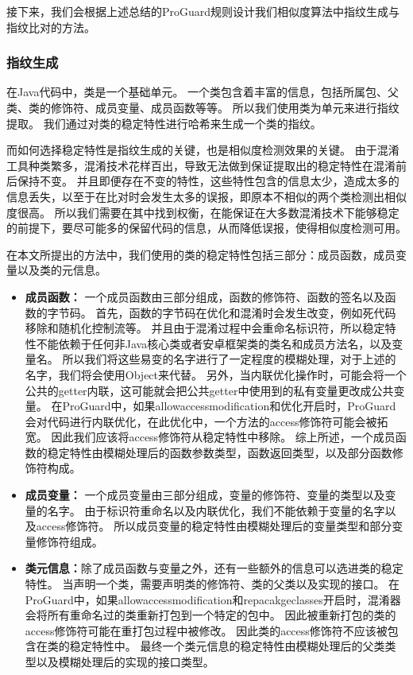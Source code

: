 接下来，我们会根据上述总结的ProGuard规则设计我们相似度算法中指纹生成与指纹比对的方法。

\subsubsection{指纹生成}

在Java代码中，类是一个基础单元。
一个类包含着丰富的信息，包括所属包、父类、类的修饰符、成员变量、成员函数等等。
所以我们使用类为单元来进行指纹提取。
我们通过对类的稳定特性进行哈希来生成一个类的指纹。

而如何选择稳定特性是指纹生成的关键，也是相似度检测效果的关键。
由于混淆工具种类繁多，混淆技术花样百出，导致无法做到保证提取出的稳定特性在混淆前后保持不变。
并且即便存在不变的特性，这些特性包含的信息太少，造成太多的信息丢失，以至于在比对时会发生太多的误报，即原本不相似的两个类检测出相似度很高。
所以我们需要在其中找到权衡，在能保证在大多数混淆技术下能够稳定的前提下，要尽可能多的保留代码的信息，从而降低误报，使得相似度检测可用。

在本文所提出的方法中，我们使用的类的稳定特性包括三部分：成员函数，成员变量以及类的元信息。

\begin{itemize}
	\item \textbf{成员函数：} 一个成员函数由三部分组成，函数的修饰符、函数的签名以及函数的字节码。
		首先，函数的字节码在优化和混淆时会发生改变，例如死代码移除和随机化控制流等。
		并且由于混淆过程中会重命名标识符，所以稳定特性不能依赖于任何非Java核心类或者安卓框架类的类名和成员方法名，以及变量名。
		所以我们将这些易变的名字进行了一定程度的模糊处理，对于上述的名字，我们将会使用Object来代替。
		另外，当内联优化操作时，可能会将一个公共的getter内联，这可能就会把公共getter中使用到的私有变量更改成公共变量。
		在ProGuard中，如果allowaccessmodification和优化开启时，ProGuard会对代码进行内联优化，在此优化中，一个方法的access修饰符可能会被拓宽。
		因此我们应该将access修饰符从稳定特性中移除。
		综上所述，一个成员函数的稳定特性由模糊处理后的函数参数类型，函数返回类型，以及部分函数修饰符构成。
	\item \textbf{成员变量：} 一个成员变量由三部分组成，变量的修饰符、变量的类型以及变量的名字。
		由于标识符重命名以及内联优化，我们不能依赖于变量的名字以及access修饰符。
		所以成员变量的稳定特性由模糊处理后的变量类型和部分变量修饰符组成。
	\item \textbf{类元信息：}除了成员函数与变量之外，还有一些额外的信息可以选进类的稳定特性。
		当声明一个类，需要声明类的修饰符、类的父类以及实现的接口。
		在ProGuard中，如果allowaccessmodification和repacakgeclasses开启时，混淆器会将所有重命名过的类重新打包到一个特定的包中。
		因此被重新打包的类的access修饰符可能在重打包过程中被修改。
		因此类的access修饰符不应该被包含在类的稳定特性中。
		最终一个类元信息的稳定特性由模糊处理后的父类类型以及模糊处理后的实现的接口类型。
\end{itemize}

